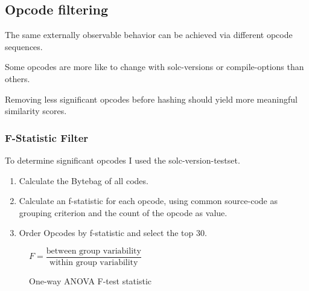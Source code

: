 \documentclass[../main.tex]{subfiles}
\begin{document}
\subsection{Opcode filtering}
The same externally observable behavior can be achieved via different opcode sequences.

Some opcodes are more like to change with solc-versions or compile-options than others.

Removing less significant opcodes before hashing should yield more meaningful similarity scores.

\subsubsection{F-Statistic Filter}
To determine significant opcodes I used the solc-version-testset\cite{solc-versions-testset}.

\begin{enumerate}
  \item Calculate the Bytebag of all codes.
  \item Calculate an f-statistic for each opcode, using common source-code as grouping criterion and the count of the opcode as value.
  \item Order Opcodes by f-statistic and select the top 30.
\end{enumerate}

\begin{figure}[ht]
  \centering
  \begin{math}
    F = \dfrac{\textrm{between group variability}}{\textrm{within group variability}}
  \end{math}
  \caption{One-way ANOVA F-test statistic}
\end{figure}
\end{document}
